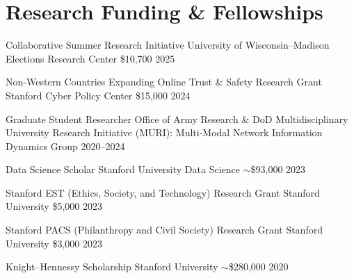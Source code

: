 \section{Research Funding \& Fellowships}


\cvaward
  {Collaborative Summer Research Initiative}
  {University of Wisconsin--Madison Elections Research Center}
  {\$10,700}
  {2025}

\cvaward
  {Non-Western Countries Expanding Online Trust \& Safety Research Grant}
  {Stanford Cyber Policy Center}
  {\$15,000}
  {2024}

\cvaward
  {Graduate Student Researcher}
  {Office of Army Research \& DoD Multidisciplinary University Research Initiative (MURI): Multi-Modal Network Information Dynamics Group}
  {}
  {2020--2024}

\cvaward
  {Data Science Scholar}
  {Stanford University Data Science}
  {$\sim$\$93,000}
  {2023}

\cvaward
  {Stanford EST (Ethics, Society, and Technology) Research Grant}
  {Stanford University}
  {\$5,000}
  {2023}

\cvaward
  {Stanford PACS (Philanthropy and Civil Society) Research Grant}
  {Stanford University}
  {\$3,000}
  {2023}

\cvaward
  {Knight--Hennessy Scholarship}
  {Stanford University}
  {$\sim$\$280,000}
  {2020}
